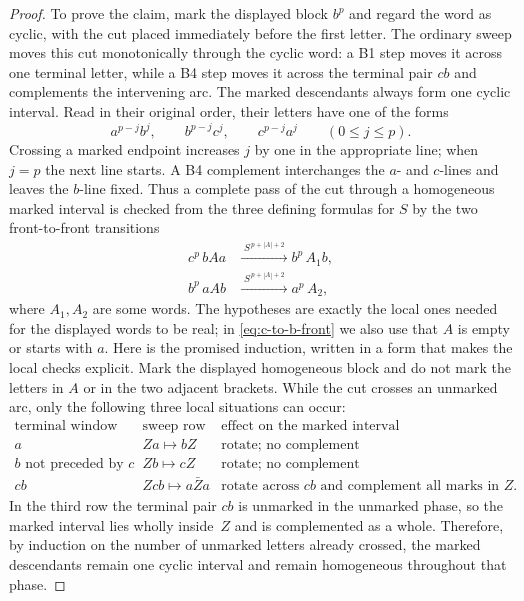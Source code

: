 \documentclass{amsart}
\theoremstyle{definition}
\theoremstyle{remark}
\begin{document}
\begin{proof}
To prove the claim, mark the displayed block $b^p$ and regard the word
as cyclic, with the cut placed immediately before the first letter.
The ordinary sweep moves this cut monotonically through the cyclic
word: a B1 step moves it across one terminal letter, while a B4 step
moves it across the terminal pair $cb$ and complements the intervening
arc.  The marked descendants always form one cyclic interval.  Read in
their original order, their letters have one of the forms
\[
  a^{p-j}b^j,\qquad b^{p-j}c^j,\qquad c^{p-j}a^j
  \qquad (0\le j\le p).
\]
Crossing a marked endpoint increases $j$ by one in the appropriate
line; when $j=p$ the next line starts.  A B4 complement interchanges
the $a$- and $c$-lines and leaves the $b$-line fixed.  Thus a complete
pass of the cut through a homogeneous marked interval is checked from
the three defining formulas for $S$ by the two front-to-front
transitions
\begin{align}
  c^p\,bAa
    &\xrightarrow{\;S^{\,p+|A|+2}\;} b^p\,A_1b, \label{eq:c-to-b-front}\\
  b^p\,aAb
    &\xrightarrow{\;S^{\,p+|A|+2}\;} a^p\,A_2,  \label{eq:b-to-a-front}
\end{align}
where $A_1,A_2$ are some words.  The hypotheses are exactly the local
ones needed for the displayed words to be real; in
\eqref{eq:c-to-b-front} we also use that $A$ is empty or starts with
$a$.  Here is the promised induction, written in a form that makes the
local checks explicit.  Mark the displayed homogeneous block and do
not mark the letters in $A$ or in the two adjacent brackets.  While the
cut crosses an unmarked arc, only the following three local situations
can occur:
\[
\begin{array}{c|c|c}
\text{terminal window} & \text{sweep row} & \text{effect on the marked interval}\\
\hline
a & Za\mapsto bZ & \text{rotate; no complement}\\
b\text{ not preceded by }c & Zb\mapsto cZ & \text{rotate; no complement}\\
cb & Zcb\mapsto a\bar Za & \text{rotate across }cb\text{ and complement all marks in }Z .
\end{array}
\]
In the third row the terminal pair $cb$ is unmarked in the unmarked
phase, so the marked interval lies wholly inside~$Z$ and is
complemented as a whole.  Therefore, by induction on the number of
unmarked letters already crossed, the marked descendants remain one
cyclic interval and remain homogeneous throughout that phase.


\end{proof}
\end{document}
